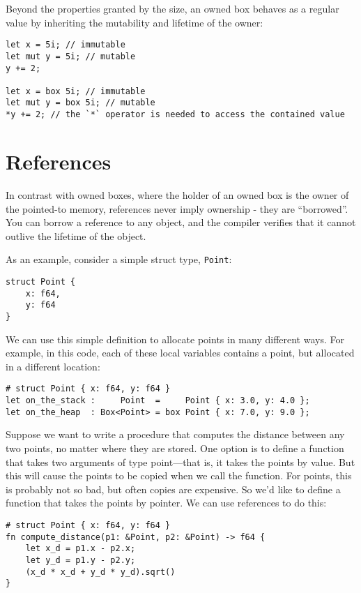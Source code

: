 \documentclass[]{article}
\begin{document}
Beyond the properties granted by the size, an owned box behaves as a
regular value by inheriting the mutability and lifetime of the owner:

\begin{verbatim}
let x = 5i; // immutable
let mut y = 5i; // mutable
y += 2;

let x = box 5i; // immutable
let mut y = box 5i; // mutable
*y += 2; // the `*` operator is needed to access the contained value
\end{verbatim}

\section{References}\label{references-1}

In contrast with owned boxes, where the holder of an owned box is the
owner of the pointed-to memory, references never imply ownership - they
are ``borrowed''. You can borrow a reference to any object, and the
compiler verifies that it cannot outlive the lifetime of the object.

As an example, consider a simple struct type, \texttt{Point}:

\begin{verbatim}
struct Point {
    x: f64,
    y: f64
}
\end{verbatim}

We can use this simple definition to allocate points in many different
ways. For example, in this code, each of these local variables contains
a point, but allocated in a different location:

\begin{verbatim}
# struct Point { x: f64, y: f64 }
let on_the_stack :     Point  =     Point { x: 3.0, y: 4.0 };
let on_the_heap  : Box<Point> = box Point { x: 7.0, y: 9.0 };
\end{verbatim}

Suppose we want to write a procedure that computes the distance between
any two points, no matter where they are stored. One option is to define
a function that takes two arguments of type point---that is, it takes
the points by value. But this will cause the points to be copied when we
call the function. For points, this is probably not so bad, but often
copies are expensive. So we'd like to define a function that takes the
points by pointer. We can use references to do this:

\begin{verbatim}
# struct Point { x: f64, y: f64 }
fn compute_distance(p1: &Point, p2: &Point) -> f64 {
    let x_d = p1.x - p2.x;
    let y_d = p1.y - p2.y;
    (x_d * x_d + y_d * y_d).sqrt()
}
\end{verbatim}
\end{document}
